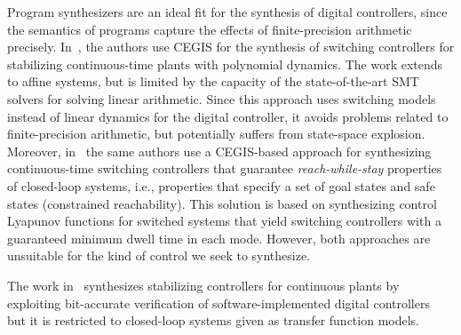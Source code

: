 \documentclass[sigconf]{llncs}
\begin{document}
Program synthesizers are an ideal fit for the synthesis of digital
controllers, since the semantics of programs capture the effects of
finite-precision arithmetic precisely. 
In~\cite{DBLP:conf/cdc/RavanbakhshS15}, the authors use CEGIS for the
synthesis of switching controllers for stabilizing continuous-time plants
with polynomial dynamics.  The work extends to affine systems, but is
limited by the capacity of the state-of-the-art SMT solvers for solving
linear arithmetic.  Since this approach uses switching models instead of
linear dynamics for the digital controller, it avoids problems related to
finite-precision arithmetic, but potentially suffers from state-space
explosion.  Moreover, in~\cite{DBLP:conf/emsoft/RavanbakhshS16} the same
authors use a CEGIS-based approach for synthesizing continuous-time
switching controllers that guarantee \emph{reach-while-stay} properties of
closed-loop systems, i.e., properties that specify a set of goal states and
safe states (constrained reachability).  This solution is based on
synthesizing control Lyapunov functions for switched systems that yield
switching controllers with a guaranteed minimum dwell time in each mode. 
However, both approaches are unsuitable for the kind of control we seek to
synthesize.

The work in~\cite{hscc-paper} synthesizes stabilizing controllers for
continuous plants by exploiting bit-accurate verification of
software-implemented digital controllers~\cite{Bessa16} but it is restricted
to closed-loop systems given as transfer function models.

\end{document}
